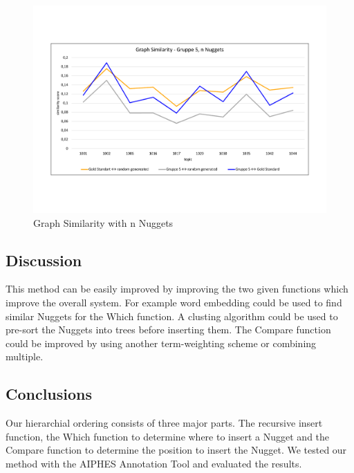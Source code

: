 \begin{figure}[H]
	\centering
	\includegraphics[trim= 0 120 0 120,width=\textwidth]{img/sim_v2.pdf}
	\caption{Graph Similarity with n Nuggets}
	\label{fig:spc}
\end{figure}



\subsection{Discussion}




This method can be easily improved by improving the two given functions which improve the overall system. For example word embedding could be used to find similar Nuggets for the Which function. A clusting algorithm could be used to pre-sort the Nuggets into trees before inserting them. The Compare function could be improved by using another term-weighting scheme or combining multiple.



\subsection{Conclusions}

Our hierarchial ordering consists of three major parts. The recursive insert function, the Which function to determine where to insert a Nugget and the Compare function to determine the position to insert the Nugget. We tested our method with the AIPHES Annotation Tool and evaluated the results.


